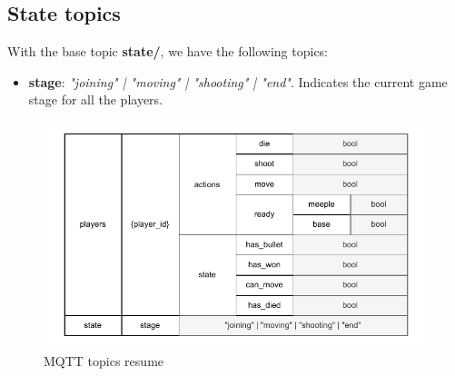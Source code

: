 \documentclass[../main.tex]{subfiles}
\begin{document}
\subsection{State topics}
\label{sec:state-topics}

With the base topic \textbf{state/}, we have the following topics:

\begin{itemize}
    \item \textbf{stage}: \textit{"joining" | "moving" | "shooting" | "end"}. Indicates the current game stage for all the players.
\end{itemize}

\begin{figure}
    \centering
    \includegraphics[width= 0.99\linewidth]{../media/figures/mqtt-topics.pdf}
    \caption{MQTT topics resume}
    \label{fig:mqtt-topics}
\end{figure}
\end{document}
